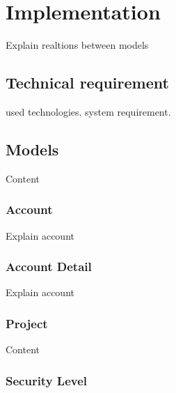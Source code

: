 
\chapter{Implementation} %

\label{ch:implementation} %

Explain realtions between models

\section{Technical requirement}

used technologies. system requirement.


\section{Models}

Content


\subsection{Account}

Explain account


\subsection{Account Detail}

Explain account


\subsection{Project}

Content


\subsection{Security Level}

